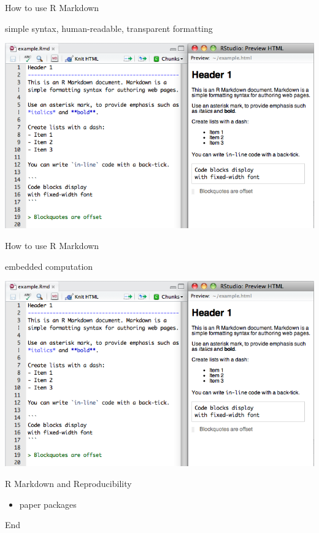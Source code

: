 \documentclass[ignorenonframetext,]{beamer}
\begin{document}
\begin{frame}{How to use R Markdown}

\begin{block}{simple syntax, human-readable, transparent formatting}

\includegraphics{images/markdownOverview.png}

\end{block}

\end{frame}

\begin{frame}{How to use R Markdown}

\begin{block}{embedded computation}

\includegraphics{images/markdownOverview.png}

\end{block}

\end{frame}

\begin{frame}{R Markdown and Reproducibility}

\begin{itemize}[<+->]
\itemsep1pt\parskip0pt
\item
  paper packages
\end{itemize}

\end{frame}

\begin{frame}{End}

\end{frame}
\end{document}

